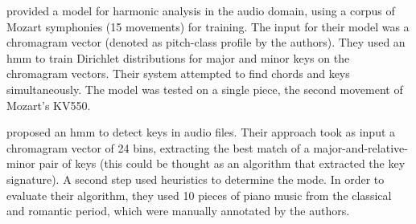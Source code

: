 \textcite{burgoyne2005learning} provided a model for
harmonic analysis in the audio domain, using a corpus of
Mozart symphonies (15 movements) for training. The input for
their model was a chromagram vector (denoted as pitch-class
profile by the authors). They used an \acrshort{hmm} to
train Dirichlet distributions for major and minor keys on
the chromagram vectors. Their system attempted to find
chords and keys simultaneously. The model was tested on a
single piece, the second movement of Mozart's KV550.

\textcite{chai2005detection} proposed an \acrshort{hmm} to
detect keys in audio files. Their approach took as input a
chromagram vector of 24 bins, extracting the best match of a
major-and-relative-minor pair of keys (this could be thought
as an algorithm that extracted the key signature). A second
step used heuristics to determine the mode. In order to
evaluate their algorithm, they used 10 pieces of piano music
from the classical and romantic period, which were manually
annotated by the authors.




